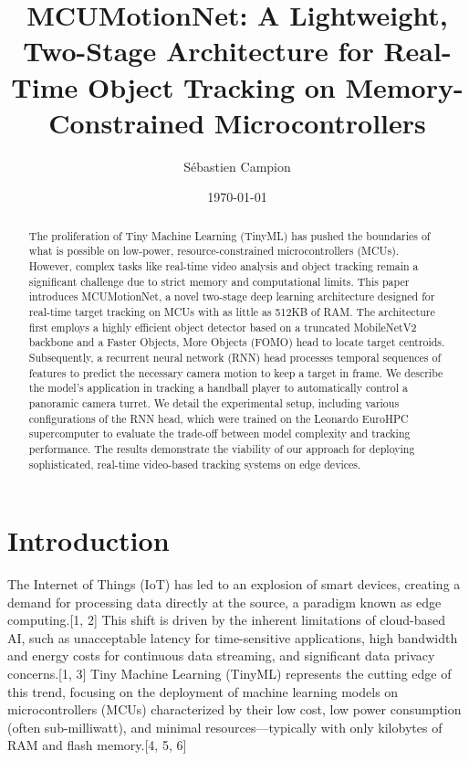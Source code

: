 \documentclass{article}
\title{MCUMotionNet: A Lightweight, Two-Stage Architecture for Real-Time Object Tracking on Memory-Constrained Microcontrollers}
\author{Sébastien Campion}
\date{\today}
\begin{document}
\maketitle

\begin{abstract}
The proliferation of Tiny Machine Learning (TinyML) has pushed the boundaries of what is possible on low-power, resource-constrained microcontrollers (MCUs).
However, complex tasks like real-time video analysis and object tracking remain a significant challenge due to strict memory and computational limits.
This paper introduces MCUMotionNet, a novel two-stage deep learning architecture designed for real-time target tracking on MCUs with as little as 512KB of RAM.
The architecture first employs a highly efficient object detector based on a truncated MobileNetV2 backbone and a Faster Objects, More Objects (FOMO) head to locate target centroids.
Subsequently, a recurrent neural network (RNN) head processes temporal sequences of features to predict the necessary camera motion to keep a target in frame.
We describe the model's application in tracking a handball player to automatically control a panoramic camera turret.
We detail the experimental setup, including various configurations of the RNN head, which were trained on the Leonardo EuroHPC supercomputer to evaluate the trade-off between model complexity and tracking performance.
The results demonstrate the viability of our approach for deploying sophisticated, real-time video-based tracking systems on edge devices.
\end{abstract}

\section{Introduction}
The Internet of Things (IoT) has led to an explosion of smart devices, creating a demand for processing data directly at the source, a paradigm known as edge computing.[1, 2] This shift is driven by the inherent limitations of cloud-based AI, such as unacceptable latency for time-sensitive applications, high bandwidth and energy costs for continuous data streaming, and significant data privacy concerns.[1, 3] Tiny Machine Learning (TinyML) represents the cutting edge of this trend, focusing on the deployment of machine learning models on microcontrollers (MCUs) characterized by their low cost, low power consumption (often sub-milliwatt), and minimal resources—typically with only kilobytes of RAM and flash memory.[4, 5, 6]
\end{document}
